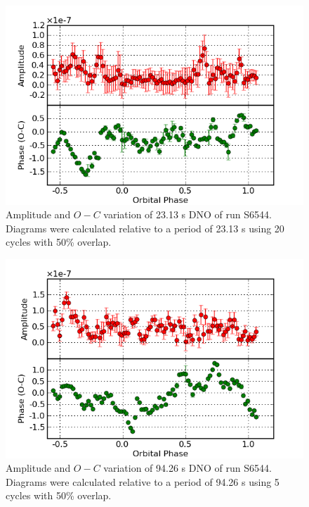 \begin{figure}
 \centering
 \includegraphics[bb=0 0 600 400,width=0.85\columnwidth]{images/archive_phot/S6544/S6544_23.13.png}
 \caption[S6544 $O-C$ diagram of DNO]{Amplitude and $O-C$ variation of 23.13 s DNO of run S6544. Diagrams were calculated relative to a period of 23.13 s using 20 cycles with 50\% overlap. }
 \label{S6544_23.13}
\end{figure}

\begin{figure}
 \centering
 \includegraphics[bb=0 0 600 400,width=0.85\columnwidth]{images/archive_phot/S6544/S6544_94.26.png}
 \caption[S6544 $O-C$ diagram of lDNO]{Amplitude and $O-C$ variation of 94.26 s DNO of run S6544. Diagrams were calculated relative to a period of 94.26 s using 5 cycles with 50\% overlap. }
 \label{S6544_94.26}
\end{figure}

